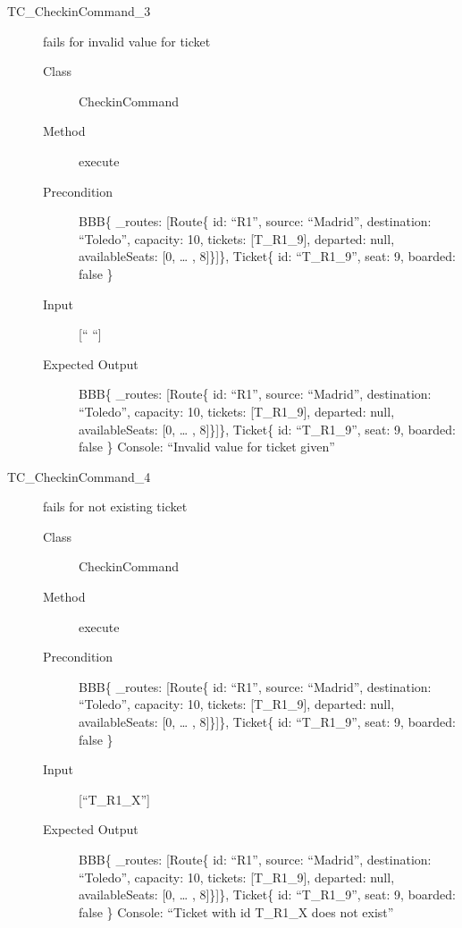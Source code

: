 \documentclass[11pt]{article}
\begin{document}
\begin{description}
\item[{TC\_CheckinCommand\_3}] fails for invalid value for ticket
\begin{description}
\item[{Class}] CheckinCommand
\item[{Method}] execute
\item[{Precondition}] BBB\{ \_routes: [Route\{ id: “R1”, source: “Madrid”, destination: “Toledo”, capacity: 10,  tickets: [T\_R1\_9], departed: null, availableSeats: [0, … , 8]\}]\}, Ticket\{ id: “T\_R1\_9”, seat: 9, boarded: false \}
\item[{Input}] [“ “]
\item[{Expected Output}] BBB\{ \_routes: [Route\{ id: “R1”, source: “Madrid”, destination: “Toledo”, capacity: 10,  tickets: [T\_R1\_9], departed: null, availableSeats: [0, … , 8]\}]\}, Ticket\{ id: “T\_R1\_9”, seat: 9, boarded: false \}
Console: “Invalid value for ticket given”
\end{description}

\item[{TC\_CheckinCommand\_4}] fails for not existing ticket
\begin{description}
\item[{Class}] CheckinCommand
\item[{Method}] execute
\item[{Precondition}] BBB\{ \_routes: [Route\{ id: “R1”, source: “Madrid”, destination: “Toledo”, capacity: 10,  tickets: [T\_R1\_9], departed: null, availableSeats: [0, … , 8]\}]\}, Ticket\{ id: “T\_R1\_9”, seat: 9, boarded: false \}
\item[{Input}] [“T\_R1\_X”]
\item[{Expected Output}] BBB\{ \_routes: [Route\{ id: “R1”, source: “Madrid”, destination: “Toledo”, capacity: 10,  tickets: [T\_R1\_9], departed: null, availableSeats: [0, … , 8]\}]\}, Ticket\{ id: “T\_R1\_9”, seat: 9, boarded: false \}
Console: “Ticket with id T\_R1\_X does not exist”
\end{description}
\end{description}
\end{document}
